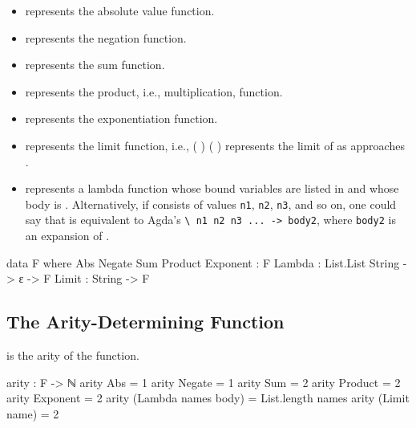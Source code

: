 \documentclass{report}
\begin{document}
\begin{itemize}
  \item {} represents the absolute value function.
  \item {} represents the negation function.
  \item {} represents the sum function.
  \item {} represents the product, i.e., multiplication, function.
  \item {} represents the exponentiation function.
  \item {} represents the limit function, i.e.,  \AgdaSymbol( \AgdaSymbol) \AgdaSymbol(   \AgdaSymbol) represents the limit of  as  approaches .
  \item {}   represents a lambda function whose bound variables are listed in  and whose body is .  Alternatively, if  consists of values \texttt{n1}, \texttt{n2}, \texttt{n3}, and so on, one could say that    is equivalent to Agda's \texttt{\textbackslash\ n1 n2 n3 ... -> body2}, where \texttt{body2} is an expansion of .
\end{itemize}

\begin{code}
data F where
  Abs
   Negate
   Sum
   Product
   Exponent : F
  Lambda : List.List String -> ε -> F
  Limit : String -> F
\end{code}

\subsection{The Arity-Determining Function}
  is the arity of the  function.

\begin{code}
arity : F -> ℕ
arity Abs = 1
arity Negate = 1
arity Sum = 2
arity Product = 2
arity Exponent = 2
arity (Lambda names body) = List.length names
arity (Limit name) = 2
\end{code}
\end{document}

